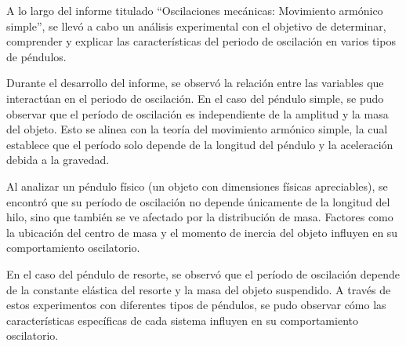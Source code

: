 \documentclass[twocolumn, 12pt]{article}
\begin{document}
A lo largo del informe titulado ``Oscilaciones mecánicas:
Movimiento armónico simple'', se llevó a cabo un análisis
experimental con el objetivo de determinar, comprender y
explicar las características del periodo de oscilación en
varios tipos de péndulos.

Durante el desarrollo del informe, se observó la relación
entre las variables que interactúan en el periodo de
oscilación. En el caso del péndulo simple, se pudo observar
que el período de oscilación es independiente de la
amplitud y la masa del objeto. Esto se alinea con la teoría
del movimiento armónico simple, la cual establece que el
período solo depende de la longitud del péndulo y la
aceleración debida a la gravedad.

Al analizar un péndulo físico (un objeto con dimensiones
físicas apreciables), se encontró que su período de
oscilación no depende únicamente de la longitud del hilo,
sino que también se ve afectado por la distribución de
masa. Factores como la ubicación del centro de masa y el
momento de inercia del objeto influyen en su comportamiento
oscilatorio.

En el caso del péndulo de resorte, se observó que el
período de oscilación depende de la constante elástica del
resorte y la masa del objeto suspendido. A través de estos
experimentos con diferentes tipos de péndulos, se pudo
observar cómo las características específicas de cada
sistema influyen en su comportamiento oscilatorio.

\printbibliography
\end{document}
